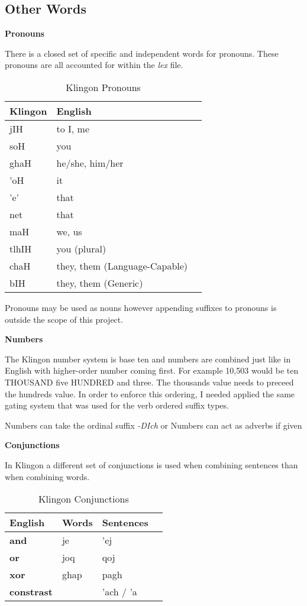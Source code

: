 \documentclass[11pt]{article}
\begin{document}
\subsection {Other Words}

\textbf{Pronouns}

There is a closed set of specific and independent words for pronouns. These pronouns are all accounted for within the \textit{lex} file.

	\begin{table}[h]
	\begin{center}
	\begin{tabular}{lll}
	\toprule
	\bf Klingon & \bf English \\
	\midrule
	jIH & to I, me \\
	soH & you \\
	ghaH & he/she, him/her \\
	'oH & it \\
	'e' & that \\
	net & that \\
	maH & we, us \\
	tlhIH & you (plural) \\
	chaH & they, them (Language-Capable) \\
	bIH & they, them (Generic) \\
	\bottomrule
	\end{tabular}
	\end{center}
	\caption{Klingon Pronouns}
	\end{table}
	
Pronouns may be used as nouns however appending suffixes to pronouns is outside the scope of this project.

\textbf{Numbers}

The Klingon number system is base ten and numbers are combined just like in English with higher-order number coming first. For example 10,503 would be ten THOUSAND five HUNDRED and three. The thousands value needs to preceed the hundreds value. In order to enforce this ordering, I needed applied the same gating system that was used for the verb ordered suffix types.

Numbers can take the ordinal suffix \textit{-DIch} or 
Numbers can act as adverbs if given 

\textbf{Conjunctions}

In Klingon a different set of conjunctions is used when combining sentences than when combining words.

	\begin{table}[h]
	\begin{center}
	\begin{tabular}{llll}
	\toprule
	\bf English & \bf Words & \bf Sentences \\
	\midrule
	\bf and & je & 'ej \\
	\bf or & joq & qoj \\
	\bf xor & ghap & pagh \\
	\bf constrast & & 'ach / 'a \\
	\bottomrule
	\end{tabular}
	\end{center}
	\caption{Klingon Conjunctions}
	\end{table}
\end{document}
